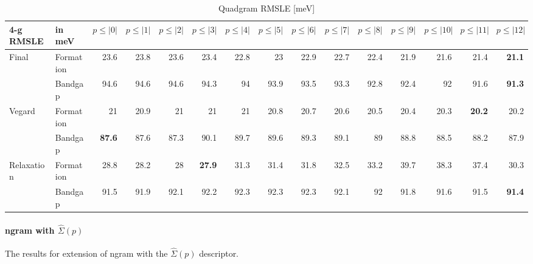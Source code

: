 \documentclass[11pt,oneside,czech,american]{book} %
\theoremstyle{definition} %
\theoremstyle{definition}
\begin{document}
\begin{table}[H]
	\scriptsize
	\centering
\begin{tabular}{llrrrrrrrrrrrrr}
	\hline
	4-g RMSLE   & in meV    &   $p{\leq}|0|$ &   $p{\leq}|1|$ &   $p{\leq}|2|$ &   $p{\leq}|3|$ &   $p{\leq}|4|$ &   $p{\leq}|5|$ &   $p{\leq}|6|$ &   $p{\leq}|7|$ &   $p{\leq}|8|$ &   $p{\leq}|9|$ &   $p{\leq}|10|$ &   $p{\leq}|11|$ &   $p{\leq}|12|$\\
	\hline
	\multirow{2}{*}{Final}       & Formation &       23.6 &       23.8 &       23.6 &       23.4 &       22.8 &       23   &       22.9 &       22.7 &       22.4 &       21.9 &        21.6 &        21.4 &        \textbf{21.1}\\
	      & Bandgap   &       94.6 &       94.6 &       94.6 &       94.3 &       94   &       93.9 &       93.5 &       93.3 &       92.8 &       92.4 &        92   &        91.6 &        \textbf{91.3}\\
	\multirow{2}{*}{Vegard}      & Formation &       21   &       20.9 &       21   &       21   &       21   &       20.8 &       20.7 &       20.6 &       20.5 &       20.4 &        20.3 &        \textbf{20.2} &        20.2\\
	      & Bandgap   &       \textbf{87.6} &       87.6 &       87.3 &       90.1 &       89.7 &       89.6 &       89.3 &       89.1 &       89   &       88.8 &        88.5 &        88.2 &        87.9\\
	\multirow{2}{*}{Relaxation}  & Formation &       28.8 &       28.2 &       28   &       \textbf{27.9} &       31.3 &       31.4 &       31.8 &       32.5 &       33.2 &       39.7 &        38.3 &        37.4 &        30.3\\
	  & Bandgap   &       91.5 &       91.9 &       92.1 &       92.2 &       92.3 &       92.3 &       92.3 &       92.1 &       92   &       91.8 &        91.6 &        91.5 &        \textbf{91.4}\\
	\hline
\end{tabular}
\caption{Quadgram RMSLE [meV]}
\label{4-g RMSLE}
\end{table}
\normalsize
\paragraph{ngram with $\hat{\Sigma}(p)$}
The results for extension of ngram with the $\hat{\Sigma}(p)$ descriptor. 
\end{document}
